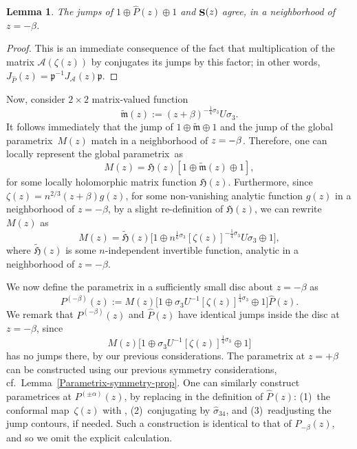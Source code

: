 \documentclass[10pt,a4paper]{amsart}
\DeclareMathOperator{\boldS}{{\bf S}}
\numberwithin{equation}{section}
\newtheorem{Lemma}[Theorem]{Lemma}
\begin{document}
\begin{Lemma}
 The jumps of $1\oplus \hat{P}(z) \oplus 1$ and $\boldS(z)$ agree, in a neighborhood of $z=-\beta$.
\end{Lemma}
 \begin{proof}
 This is an immediate consequence of the fact that multiplication of the matrix $\mathcal{A}(\zeta(z))$ by  conjugates its jumps by this factor; in other words, $J_{\hat{P}}(z) = \mathfrak{p}^{-1}J_{\mathcal{A}}(z)\mathfrak{p}$.
 \end{proof}

Now, consider $2\times 2$ matrix-valued function
 \begin{equation*}
 \tilde{\mathfrak{m}}(z) := (z+\beta)^{-\frac{1}{4}\sigma_3} U \sigma_3.
 \end{equation*}
It follows immediately that the jump of $1\oplus \tilde{\mathfrak{m}} \oplus 1$ and the jump of the global parametrix~$M(z)$ match in a neighborhood of $z\hspace{-0.25pt}=\hspace{-0.25pt}-\beta$.
Therefore, one can locally represent the global parametrix~as%
\begin{equation*}
 M(z) = \mathfrak{H}(z) [1\oplus \tilde{\mathfrak{m}}(z) \oplus 1],
\end{equation*}
for some locally holomorphic matrix function $\mathfrak{H}(z)$. Furthermore, since $\zeta(z) = n^{2/3} (z+\beta) g(z)$, for some non-vanishing analytic function $g(z)$ in a neighborhood of $z=-\beta$, by a slight re-definition of $\mathfrak{H}(z)$, we can rewrite $M(z)$ as
 \begin{equation*}
 M(z) = \tilde{\mathfrak{H}}(z) \bigl[1\oplus n^{\frac{1}{6}\sigma_3}[\zeta(z)]^{-\frac{1}{4}\sigma_3} U \sigma_3 \oplus 1 \bigr],
 \end{equation*}
where $\tilde{\mathfrak{H}}(z)$ is some $n$-independent invertible function, analytic in a neighborhood of $z=-\beta$.

We now define the parametrix in a sufficiently small disc about $z=-\beta$ as
 \begin{equation*}
 P^{(-\beta)}(z) := M(z) \bigl[1\oplus \sigma_3 U^{-1}[\zeta(z)]^{\frac{1}{4}\sigma_3} \oplus 1 \bigr] \hat{P}(z).
 \end{equation*}
We remark that $P^{(-\beta)}(z)$ and $\hat{P}(z)$ have identical jumps inside the disc at $z=-\beta$, since
\begin{equation*}
M(z) \bigl[1\oplus \sigma_3 U^{-1}[\zeta(z)]^{\frac{1}{4}\sigma_3} \oplus 1 \bigr]
\end{equation*}
has no jumps there, by our previous considerations. The parametrix at $z=+\beta$ can be constructed using our previous symmetry considerations, cf.\ Lemma~\ref{Parametrix-symmetry-prop}. One can similarly construct parametrices at $P^{(\pm\alpha)}(z)$, by replacing in the definition of $\hat{P}(z)$: (1)~the conformal
map~$\zeta(z)$ with , (2)~conjugating by $\hat{\sigma}_{34}$, and (3)~readjusting the jump contours, if needed. Such a construction is identical to that of $P_{-\beta}(z)$, and so we omit the explicit calculation.
\end{document}

